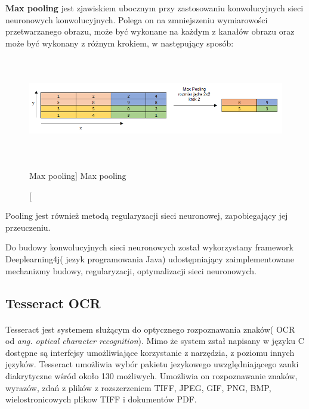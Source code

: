 \documentclass[a4paper,12pt]{article}
\begin{document}
	    \par \textbf{Max pooling}
	     jest zjawiskiem ubocznym przy zastosowaniu konwolucyjnych sieci neuronowych konwolucyjnych. Polega on na zmniejszeniu wymiarowości przetwarzanego obrazu, może być wykonane na każdym z kanałów obrazu oraz może być wykonany z różnym krokiem, w następujący sposób: 
	 
	    \begin{figure}[!ht]
            \centering
                \includegraphics[width=17cm, height=4.5cm]{image//maxPoolingImg.png}
                \caption
                [Max pooling]
                {Max pooling}
        \end{figure}

        \newpage
        
        Pooling jest również metodą regularyzacji sieci neuronowej, zapobiegający jej przeuczeniu.
        
        Do budowy konwolucyjnych sieci neuronowych został wykorzystany framework Deeplearning4j( jezyk programowania Java) udostępniający zaimplementowane mechanizmy budowy, regularyzacji, optymalizacji sieci neuronowych. 
    
	\subsection{Tesseract OCR}
	    \paragraph{} Tesseract jest systemem służącym do optycznego rozpoznawania znaków( OCR od \textit{ang. optical character recognition}). Mimo że system zstał napisany w języku C dostępne są interfejsy umożliwiające korzystanie z narzędzia, z poziomu innych języków. Tesseract umożliwia wybór pakietu jezykowego uwzględniającego zanki diakrytyczne wśród około 130 możliwych. Umożliwia on rozpoznawanie znaków, wyrazów, zdań z plików z rozszerzeniem TIFF, JPEG, GIF, PNG, BMP, wielostronicowych plikow TIFF i dokumentów PDF.
   
\end{document}
